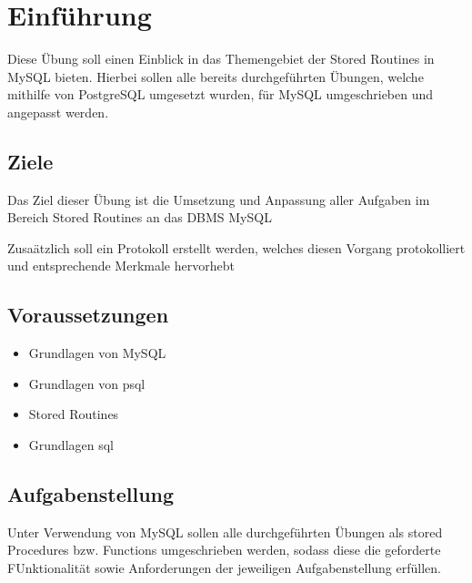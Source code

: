 
\section{Einführung}
Diese Übung soll einen Einblick in das Themengebiet der  Stored Routines in MySQL bieten. Hierbei sollen alle bereits durchgeführten Übungen, welche mithilfe von PostgreSQL umgesetzt wurden, für MySQL umgeschrieben und angepasst werden.

\subsection{Ziele}
Das Ziel dieser Übung ist die Umsetzung und Anpassung aller Aufgaben im Bereich Stored Routines an das DBMS MySQL

Zusaätzlich soll ein Protokoll erstellt werden, welches diesen Vorgang protokolliert und entsprechende Merkmale hervorhebt
\subsection{Voraussetzungen}
\begin{itemize}
	\item Grundlagen von MySQL
	\item Grundlagen von psql
	\item Stored Routines
	\item Grundlagen sql
\end{itemize}

\subsection{Aufgabenstellung}
Unter Verwendung von MySQL sollen alle durchgeführten Übungen als stored Procedures bzw. Functions umgeschrieben werden, sodass diese die geforderte FUnktionalität sowie Anforderungen der jeweiligen Aufgabenstellung erfüllen.
\clearpage
